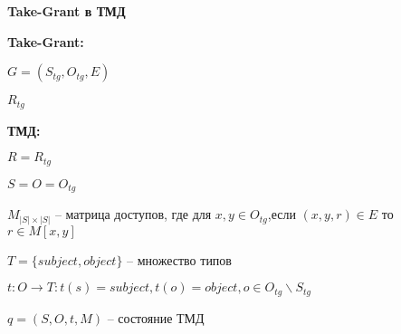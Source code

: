 \textbf{Take-Grant в ТМД}

	\textbf{Take-Grant:}
	\begin{multicols}{2}
		\begin{enumerate*}
			\item $G=(S_{tg}, O_{tg}, E)$
			\item $R_{tg}$
		\end{enumerate*}
	\end{multicols}

	\textbf{ТМД:}

	\begin{multicols}{2}
		\begin{enumerate*}
			\item $R = R_{tg}$
			\item $S = O = O_{tg}$
			\item $M_{|S| \times |S|}$ -- матрица доступов, где для $x,y \in O_{tg}$,если $(x, y, r) \in E$ то $r \in M[x,y]$
			\item $T = \{subject, object\}$ -- множество типов
			\item $t: O \to T : t(s) = subject, t(o) = object, o \in O_{tg} \backslash S_{tg}$
			\item $q = (S, O, t, M)$ -- состояние ТМД
		\end{enumerate*}
	\end{multicols}



